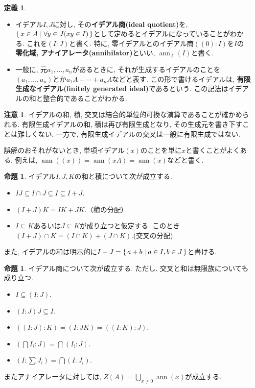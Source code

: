 \documentclass[a4paper, twoside]{bxjsarticle}
\DeclareMathOperator{\ann}{ann}
\newcommand{\tb}{\textbf}
\theoremstyle{definition}
\newtheorem{prop}[thm]{命題}
\newtheorem{defn}[thm]{定義}
\newtheorem{rem}[thm]{注意}
\begin{document}
\begin{defn}
\begin{itemize}
                \item イデアル$I, J$に対し, その\tb{イデアル商(ideal quotient)}を, $\set{x\in A|\forall y\in J(xy\in I)}$として定めるとイデアルになっていることがわかる. これを$(I\colon J)$と書く. 特に, 零イデアルとのイデアル商$((0)\colon I)$を$I$の\tb{零化域, アナイアレータ(annihilator)}といい, $\ann_A(I)$と書く.
                
                \item 一般に, 元$a_1, \dots, a_n$があるときに, それが生成するイデアルのことを$(a_1, \dots, a_n)$とか$a_1 A+\cdots+a_n A$などと表す. この形で書けるイデアルは, \tb{有限生成なイデアル(finitely generated ideal)}であるという. この記法はイデアルの和と整合的であることがわかる.
            \end{itemize}
        \end{defn}
        \begin{rem}
            イデアルの和, 積, 交叉は結合的単位的可換な演算であることが確かめられる. 有限生成イデアルの和, 積は再び有限生成となり, その生成元を書き下すことは難しくない. 一方で, 有限生成イデアルの交叉は一般に有限生成ではない.

            誤解のおそれがないとき, 単項イデアル$(x)$のことを単に$x$と書くことがよくある. 例えば, $\ann((x))=\ann(xA)=\ann(x)$などと書く.
        \end{rem}
        \begin{prop}
            イデアル$I, J, K$の和と積について次が成立する.
            \begin{itemize}
                \item $IJ\subseteq I\cap J\subseteq I\subseteq I+J$.
                \item $(I+J)K = IK+JK$.（積の分配）
                \item $I\subseteq K$あるいは$J\subseteq K$が成り立つと仮定する. このとき$(I+J)\cap K = (I\cap K)+(J\cap K)$.(交叉の分配)
            \end{itemize}
            また, イデアルの和は明示的に$I+J=\set{a+b|a\in I, b\in J}$と書ける.
        \end{prop}
        \begin{prop}
            イデアル商について次が成立する. ただし, 交叉と和は無限族についても成り立つ.
            \begin{itemize}
                \item $I\subseteq (I:J)$.
                \item $(I:J)J\subseteq I$.
                \item $((I:J):K) = (I:JK)=((I:K):J)$.
                \item $(\bigcap I_i : J) = \bigcap(I_i: J)$.
                \item $(I: \sum J_i) = \bigcap(I:J_i)$.
            \end{itemize}
            
            またアナイアレータに対しては, $Z(A)=\bigcup_{x\neq 0}\ann(x)$が成立する. 
        \end{prop}
\end{document}
